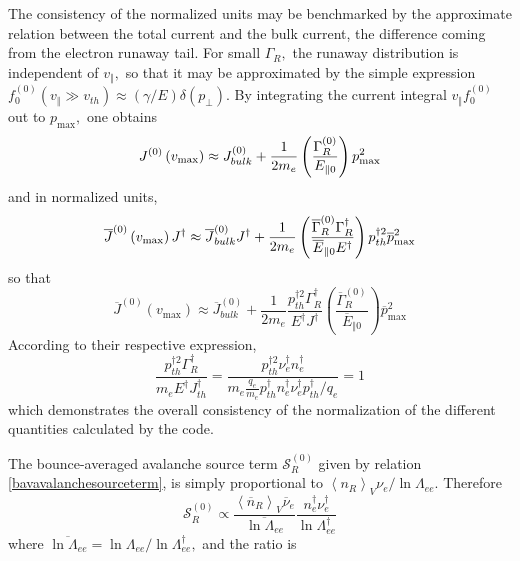 The consistency of the normalized units may be benchmarked by the
approximate relation between the total current and the bulk current, the
difference coming from the electron runaway tail. For small $\Gamma _{R},$
the runaway distribution is independent of $v_{\Vert },$ so that it may be
approximated by the simple expression $f_{0}^{\left( 0\right) }\left(
v_{\Vert }\gg v_{th}\right) \approx \left( \gamma /E\right) \delta \left(
p_{\bot }\right) .$ By integrating the current integral $v_{\Vert
}f_{0}^{\left( 0\right) }$ out to $p_{\max },$ one obtains 
\begin{equation}
J^{\left( 0\right) }\left( v_{\max }\right) \approx J_{bulk}^{\left(
0\right) }+\frac{1}{2m_{e}}\left( \frac{\Gamma _{R}^{\left( 0\right) }}{%
E_{\Vert 0}}\right) p_{\max }^{2}
\end{equation}
and in normalized units, 
\begin{equation}
\overline{J}^{\left( 0\right) }\left( v_{\max }\right) J^{\dag }\approx 
\overline{J}_{bulk}^{\left( 0\right) }J^{\dag }+\frac{1}{2m_{e}}\left( \frac{%
\overline{\Gamma }_{R}^{\left( 0\right) }\Gamma _{R}^{\dag }}{\overline{E}%
_{\Vert 0}E^{\dag }}\right) p_{th}^{\dag 2}\overline{p}_{\max }^{2}
\end{equation}
so that 
\begin{equation}
\overline{J}^{\left( 0\right) }\left( v_{\max }\right) \approx \overline{J}%
_{bulk}^{\left( 0\right) }+\frac{1}{2m_{e}}\frac{p_{th}^{\dag 2}\Gamma
_{R}^{\dag }}{E^{\dag }J^{\dag }}\left( \frac{\overline{\Gamma }_{R}^{\left(
0\right) }}{\overline{E}_{\Vert 0}}\right) \overline{p}_{\max }^{2}
\end{equation}
According to their respective expression, 
\begin{equation}
\frac{p_{th}^{\dag 2}\Gamma _{R}^{\dag }}{m_{e}E^{\dag }J_{th}^{\dag }}=%
\frac{p_{th}^{\dag 2}\nu _{e}^{\dag }n_{e}^{\dag }}{m_{e}\frac{q_{e}}{m_{e}}%
p_{th}^{\dag }n_{e}^{\dag }\nu _{e}^{\dag }p_{th}^{\dag }/q_{e}}=1
\end{equation}
which demonstrates the overall consistency of the normalization of the
different quantities calculated by the code.

The bounce-averaged avalanche source term $\mathcal{S}_{R}^{\left( 0\right)
} $ given by relation \ref{bavavalanchesourceterm}, is simply proportional
to $\left\langle n_{R}\right\rangle _{V}\nu _{e}/\ln \Lambda _{ee}.$
Therefore 
\begin{equation}
\mathcal{S}_{R}^{\left( 0\right) }\propto \frac{\left\langle \overline{n}%
_{R}\right\rangle _{V}\overline{\nu }_{e}}{\overline{\ln \Lambda _{ee}}}%
\frac{n_{e}^{\dag }\nu _{e}^{\dag }}{\ln \Lambda _{ee}^{\dag }}
\end{equation}
where $\overline{\ln \Lambda _{ee}}=\ln \Lambda _{ee}/\ln \Lambda
_{ee}^{\dag },$ and the ratio is

